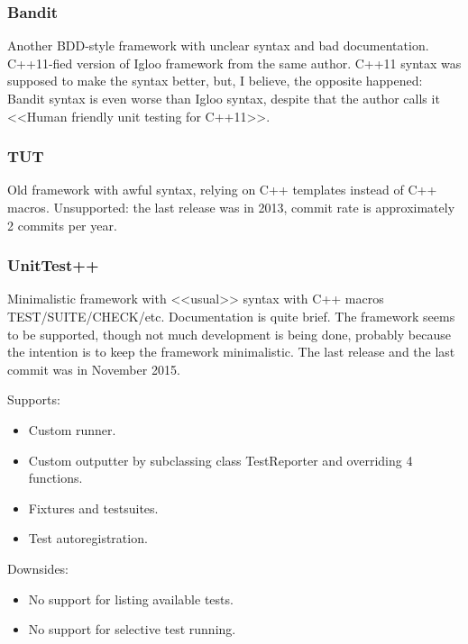 \documentclass[10pt, a5paper]{article}
\begin{document}
\subsubsection*{Bandit}

Another BDD-style framework with unclear syntax and bad \linebreak documentation. C++11-fied version of Igloo framework from the same author. C++11 syntax was supposed to make the syntax better, but, I believe, the opposite happened: Bandit syntax is even worse than Igloo syntax, despite that the author calls it <<Human friendly unit testing for C++11>>.

\subsubsection*{TUT}

Old framework with awful syntax, relying on C++ templates instead of C++ macros. Unsupported: the last release was in 2013, commit rate is approximately 2 commits per year.

\subsubsection*{UnitTest++}

Minimalistic framework with <<usual>> syntax with C++ macros TEST/SUITE/CHECK/etc. Documentation is quite brief. \linebreak The framework seems to be supported, though not much development is being done, probably because the intention is to keep the framework minimalistic. The last release and the last commit was in November 2015.

Supports:

\begin{itemize}
  \item Custom runner.
  \item Custom outputter by subclassing class TestReporter and \linebreak overriding 4 functions.
  \item Fixtures and testsuites.
  \item Test autoregistration.
\end{itemize}

Downsides:

\begin{itemize}
  \item No support for listing available tests.
  \item No support for selective test running.
\end{itemize}
\end{document}
